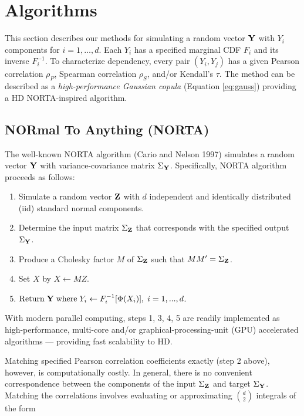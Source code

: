 \documentclass{article}
\begin{document}
\hypertarget{algorithms}{%
\section{Algorithms}\label{algorithms}}

This section describes our methods for simulating a random vector
\(\bf Y\) with \(Y_i\) components for \(i=1,\ldots,d\). Each \(Y_i\) has
a specified marginal CDF \(F_i\) and its inverse \(F^{-1}_i\). To
characterize dependency, every pair \((Y_i, Y_j)\) has a given Pearson
correlation \(\rho_P\), Spearman correlation \(\rho_S\), and/or
Kendall's \(\tau\). The method can be described as a
\emph{high-performance Gaussian copula} (Equation \ref{eq:gauss})
providing a HD NORTA-inspired algorithm.

\hypertarget{normal-to-anything-norta}{%
\subsection{NORmal To Anything (NORTA)}\label{normal-to-anything-norta}}

The well-known NORTA algorithm (Cario and Nelson 1997) simulates a
random vector \(\bf Y\) with variance-covariance matrix
\(\Sigma_{\bf Y}\). Specifically, NORTA algorithm proceeds as follows:

\begin{enumerate}
\def\labelenumi{\arabic{enumi}.}
\tightlist
\item
  Simulate a random vector \(\bf Z\) with \(d\) independent and
  identically distributed (iid) standard normal components.
\item
  Determine the input matrix \(\Sigma_{\bf Z}\) that corresponds with
  the specified output \(\Sigma_{\bf Y}\).
\item
  Produce a Cholesky factor \(M\) of \(\Sigma_{\bf Z}\) such that
  \(M M^{\prime}=\Sigma_{\bf Z}\).
\item
  Set \(X\) by \(X \gets MZ\).
\item
  \(\text{Return} \; {\bf Y} \; \text{where} \; Y_i \gets F_i^{-1}[\Phi(X_i)], \; i=1,...,d\).
\end{enumerate}

With modern parallel computing, steps 1, 3, 4, 5 are readily implemented
as high-performance, multi-core and/or graphical-processing-unit (GPU)
accelerated algorithms --- providing fast scalability to HD.

Matching specified Pearson correlation coefficients exactly (step 2
above), however, is computationally costly. In general, there is no
convenient correspondence between the components of the input
\(\Sigma_{\bf Z}\) and target \(\Sigma_{\bf Y}\). Matching the
correlations involves evaluating or approximating \(\binom{d}{2}\)
integrals of the form
\end{document}

